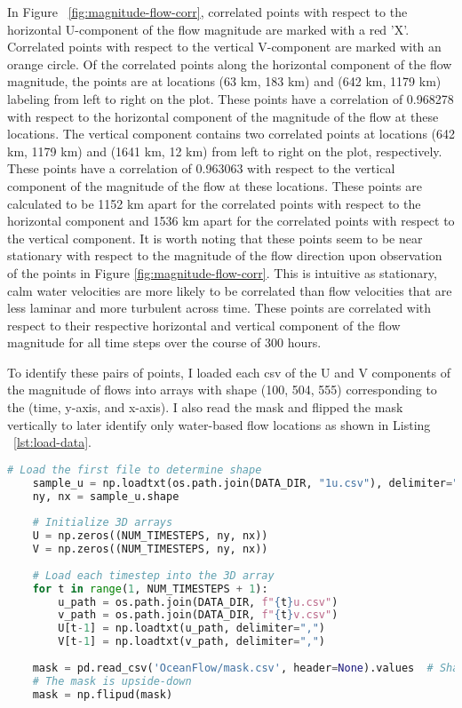 \documentclass[11pt]{article}
\begin{document}
In Figure ~\ref{fig:magnitude-flow-corr}, correlated points with respect to the horizontal U-component of the flow magnitude are marked with a red 'X'.
Correlated points with respect to the vertical V-component are marked with an orange circle. Of the correlated points along the horizontal component of the flow magnitude, the points are at locations (63 km, 183 km) and (642 km, 1179 km) labeling from left to right on the plot. These points have a correlation of 0.968278 with respect to the horizontal component of the magnitude of the flow at these locations.
The vertical component contains two correlated points at locations (642 km, 1179 km) and (1641 km, 12 km) from left to right on the plot, respectively. These points have a correlation of 0.963063 with respect to the vertical component of the magnitude of the flow at these locations. These points are calculated to be 1152 km apart for the correlated points with respect to the horizontal component and 1536 km apart for the correlated points with respect to the vertical component. It is worth noting that these points seem to be near stationary with respect to the magnitude of the flow direction upon observation of the points in Figure \ref{fig:magnitude-flow-corr}. This is intuitive as stationary, calm water velocities are more likely to be correlated than flow velocities that are less laminar and more turbulent across time. These points are correlated with respect to their respective horizontal and vertical component of the flow magnitude for all time steps over the course of 300 hours. 

To identify these pairs of points, I loaded each csv of the U and V components of the magnitude of flows into arrays with shape (100, 504, 555) corresponding to the (time, y-axis, and x-axis). I also read the mask and flipped the mask vertically to later identify only water-based flow locations as shown in Listing ~\ref{lst:load-data}. 

\begin{lstlisting}[language=Python, label=lst:load-data, caption={Loading matrices U, V, and mask.}]
    # Load the first file to determine shape
    sample_u = np.loadtxt(os.path.join(DATA_DIR, "1u.csv"), delimiter=",")
    ny, nx = sample_u.shape
    
    # Initialize 3D arrays
    U = np.zeros((NUM_TIMESTEPS, ny, nx))
    V = np.zeros((NUM_TIMESTEPS, ny, nx))
    
    # Load each timestep into the 3D array
    for t in range(1, NUM_TIMESTEPS + 1):
        u_path = os.path.join(DATA_DIR, f"{t}u.csv")
        v_path = os.path.join(DATA_DIR, f"{t}v.csv")
        U[t-1] = np.loadtxt(u_path, delimiter=",")
        V[t-1] = np.loadtxt(v_path, delimiter=",")
    
    mask = pd.read_csv('OceanFlow/mask.csv', header=None).values  # Shape: (504, 555)
    # The mask is upside-down
    mask = np.flipud(mask)
    
    \end{lstlisting}
\FloatBarrier
\end{document}
